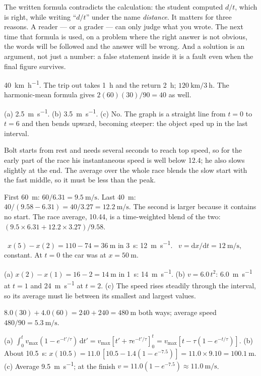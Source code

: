 \documentclass[11pt,twoside,openany]{book}
\newcommand{\dd}{\mathrm{d}}
\newcommand{\viewtag}[3]{\fcolorbox{#2}{#3}{\footnotesize\textbf{\textcolor{#2}{#1}}}}
\newcommand{\elemtag}{\viewtag{Elementary}{elemcol}{elempale}}
\newcommand{\calctag}{\viewtag{Calculus}{calccol}{calcpale}}
\begin{document}
\begin{description}[leftmargin=2.6em,itemsep=3pt,style=sameline]
  \item[1.28] The written formula contradicts the calculation: the student computed $d/t$, which is right, while writing ``$d/t$'' under the name \emph{distance}. It matters for three reasons. A reader --- or a grader --- can only judge what you wrote. The next time that formula is used, on a problem where the right answer is not obvious, the words will be followed and the answer will be wrong. And a solution is an argument, not just a number: a false statement inside it is a fault even when the final figure survives.
  \item[1.29] \SI{40}{\kilo\metre\per\hour}. The trip out takes \SI{1}{\hour} and the return \SI{2}{\hour}; $\SI{120}{\kilo\metre}/\SI{3}{\hour}$. The harmonic-mean formula gives $2(60)(30)/90 = 40$ as well.
  \item[1.30] (a) \SI{2.5}{\metre\per\second}. (b) \SI{3.5}{\metre\per\second}. (c) No. The graph is a straight line from $t=0$ to $t=6$ and then bends upward, becoming steeper: the object sped up in the last interval.
  \item[1.31] Bolt starts from rest and needs several seconds to reach top speed, so for the early part of the race his instantaneous speed is well below \num{12.4}; he also slows slightly at the end. The average over the whole race blends the slow start with the fast middle, so it must be less than the peak.
  \item[1.32] First \SI{60}{\metre}: $60/6.31 = \SI{9.5}{\metre\per\second}$. Last \SI{40}{\metre}: $40/(9.58 - 6.31) = 40/3.27 = \SI{12.2}{\metre\per\second}$. The second is larger because it contains no start. The race average, \num{10.44}, is a time-weighted blend of the two: $(9.5 \times 6.31 + 12.2 \times 3.27)/9.58$.
  \item[1.33] \elemtag\ $x(5) - x(2) = 110 - 74 = \SI{36}{\metre}$ in \SI{3}{\second}: \SI{12}{\metre\per\second}. \calctag\ $v = \dd x/\dd t = \SI{12}{\metre\per\second}$, constant. At $t = 0$ the car was at $x = \SI{50}{\metre}$.
  \item[1.34] (a) $x(2) - x(1) = 16 - 2 = \SI{14}{\metre}$ in \SI{1}{\second}: \SI{14}{\metre\per\second}. (b) $v = 6.0\,t^2$: \SI{6.0}{\metre\per\second} at $t = 1$ and \SI{24}{\metre\per\second} at $t = 2$. (c) The speed rises steadily through the interval, so its average must lie between its smallest and largest values.
  \item[1.35] $8.0(30) + 4.0(60) = 240 + 240 = \SI{480}{\metre}$ both ways; average speed $480/90 = \SI{5.3}{\metre\per\second}$.
  \item[1.36] (a) $\int_0^t v_{\max}(1 - e^{-t'/\tau})\,\dd t' = v_{\max}\left[t' + \tau e^{-t'/\tau}\right]_0^t = v_{\max}[t - \tau(1 - e^{-t/\tau})]$. (b) About \SI{10.5}{\second}: $x(10.5) = 11.0\,[10.5 - 1.4(1 - e^{-7.5})] = 11.0 \times 9.10 = \SI{100.1}{\metre}$. (c) Average \SI{9.5}{\metre\per\second}; at the finish $v = 11.0(1 - e^{-7.5}) \approx \SI{11.0}{\metre\per\second}$.

\end{description}
\end{document}
